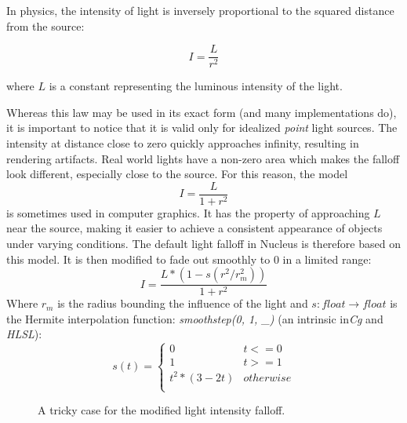In physics, the intensity of light is inversely proportional to the squared distance from the source:
	
\[
	I = \frac{L}{r^2}
\]

where $L$ is a constant representing the luminous intensity of the light.

Whereas this law may be used in its exact form (and many implementations do), it is important to notice that it is valid only for idealized \emph{point} light sources. The intensity at distance close to zero quickly approaches infinity, resulting in rendering artifacts. Real world lights have a non-zero area which makes the falloff look different, especially close to the source. For this reason, the model
\[
	I = \frac{L}{1 + r^2}
\]
is sometimes used in computer graphics. It has the property of approaching $L$ near the source, making it easier to achieve a consistent appearance of objects under varying conditions. The default light falloff in Nucleus is therefore based on this model. It is then modified to fade out smoothly to $0$ in a limited range:
\[
	I = \frac{L * (1 - s(r^2 / r_m^2))}{1 + r^2}
\]
Where $r_m$ is the radius bounding the influence of the light and $s : float \rightarrow float$ is the Hermite interpolation function: \emph{smoothstep(0, 1, \_)} (an intrinsic in\emph{Cg} and \emph{HLSL}):
\[
	s(t) =
	\begin{cases}
	0 & t <= 0 \\
	1 & t >= 1 \\
	t^2 * (3 - 2t) & otherwise \\
	\end{cases}
\]

\begin{figure}[ht!]
  \centering
  \caption[Modified falloff, tricky case]{A tricky case for the modified light intensity falloff.}
\label{fig:lppFalloffTrickyCase}
\end{figure}

